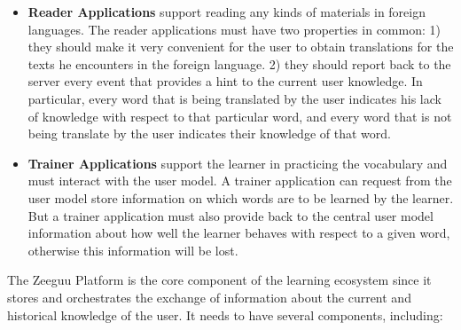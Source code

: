 \begin{itemize}
	
	\item {\bf Reader Applications} 
	support reading any kinds of materials in foreign languages. The reader applications must have two properties in common: 
		1) they should make it very convenient for the user to obtain translations for the texts he encounters in the foreign language. 
		2) they should report back to the server every event that provides a hint to the current user knowledge. In particular, every word that is being translated by the user indicates his lack of knowledge with respect to that particular word, and every word that is not being translate by the user indicates their knowledge of that word.
	
		\item {\bf Trainer Applications} support the learner in practicing the vocabulary and must interact with the user model. A trainer application can request from the user model store information on which words are to be learned by the learner. But a trainer application must also provide back to the central user model information about how well the learner behaves with respect to a given word, otherwise this information will be lost. 

\end{itemize}



The Zeeguu Platform is the core component of the learning ecosystem since it stores and orchestrates the exchange of information about the current and historical knowledge of the user. It needs to have several components, including: 

